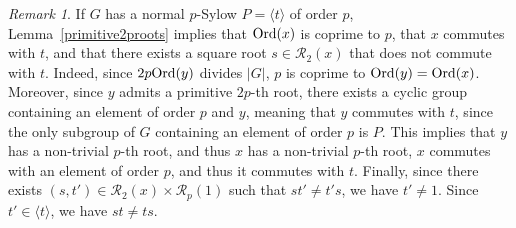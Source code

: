 \documentclass[12pt]{amsart}
\numberwithin{equation}{section}
\newcommand{\Ord}{{\rm Ord}}
\theoremstyle{definition}
\theoremstyle{remark}
\newtheorem{rk}{Remark}[section]
\begin{document}
\begin{rk}\label{noncommutativity-normalpsylow}
    If $G$ has a normal $p$-Sylow $P=\langle t\rangle$ of order $p$, Lemma~\ref{primitive2proots} implies that $\Ord(x)$ is coprime to $p$, that $x$ commutes with $t$, and that there exists a square root $s\in\mathcal{R}_2(x)$ that does not commute with $t$. Indeed, since $2p\Ord(y)$ divides $|G|$, $p$ is coprime to $\Ord(y)=\Ord(x)$. Moreover, since $y$ admits a primitive $2p$-th root, there exists a cyclic group containing an element of order $p$ and $y$, meaning that $y$ commutes with $t$, since the only subgroup of $G$ containing an element of order $p$ is $P$. This implies that $y$ has a non-trivial $p$-th root, and thus $x$ has a non-trivial $p$-th root, $x$ commutes with an element of order $p$, and thus it commutes with $t$. Finally, since there exists $(s,t')\in \mathcal{R}_2(x)\times \mathcal{R}_p(1)$ such that $st'\ne t's$, we have $t'\ne 1$.  Since $t'\in \langle t\rangle$, we have $st\ne ts$.
\end{rk}
\end{document}

